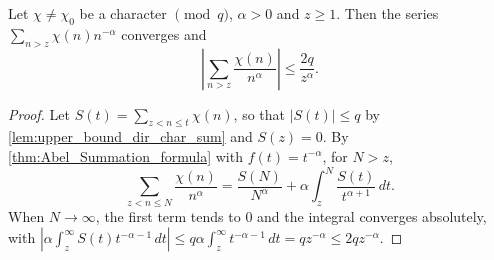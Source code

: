 \begin{lemma}\label{lem:tail_dir_char_sum}
    Let $\chi\neq\chi_0$ be a character $\pmod q$, $\alpha>0$ and $z \ge 1$. Then the series $\sum_{n>z}\chi(n)n^{-\alpha}$ converges and
    \begin{equation*}
        \left\lvert\sum_{n>z}\frac{\chi(n)}{n^\alpha}\right\rvert\le\frac{2q}{z^\alpha}.
    \end{equation*}
\end{lemma}
\begin{proof}
    Let $S(t) = \sum_{z<n\le t}\chi(n)$, so that $\lvert S(t)\rvert \le q$ by \cref{lem:upper_bound_dir_char_sum} and $S(z) = 0$. By \cref{thm:Abel_Summation_formula} with $f(t) = t^{-\alpha}$, for $N>z$,
    \begin{equation*}
        \sum_{z<n\le N}\frac{\chi(n)}{n^\alpha} = \frac{S(N)}{N^\alpha} + \alpha\int_z^N\frac{S(t)}{t^{\alpha+1}}\,dt.
    \end{equation*}
    When $N\to\infty$, the first term tends to $0$ and the integral converges absolutely, with $\left\lvert\alpha\int_z^\infty S(t)t^{-\alpha-1}\,dt\right\rvert\le q\alpha\int_z^\infty t^{-\alpha-1}\,dt = qz^{-\alpha}\le 2qz^{-\alpha}$.
\end{proof}

